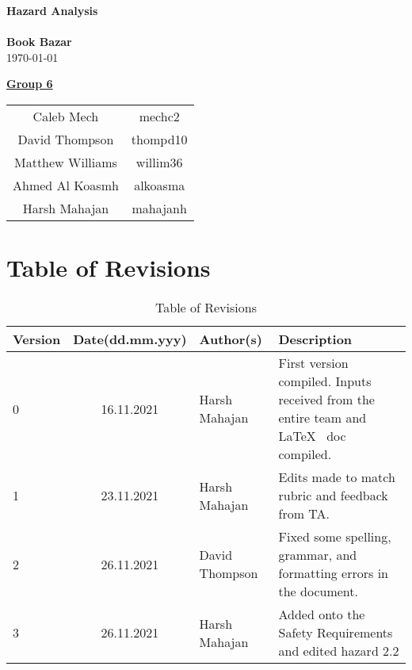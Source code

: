\documentclass[fullpage]{article}
\begin{document}
\vspace*{\fill}
\begin{center}

  {\Huge \textbf{Hazard Analysis}}\\
\hrulefill\\[2mm]
  {\huge \textbf{Book Bazar}}\\[2mm]
{\large \today}\\[15mm]
{\large
\underline{\textbf{Group 6}}\\
\begin{tabular}{ c c }

 Caleb Mech & mechc2\\
 David Thompson & thompd10\\
 Matthew Williams & willim36\\
 Ahmed Al Koasmh & alkoasma\\
 Harsh Mahajan	& mahajanh
\end{tabular}
}

\end{center}

\vspace*{\fill}

\newpage
\begingroup
\hypersetup{hidelinks}
\tableofcontents

\listoftables
\endgroup
\newpage


\section*{Table of Revisions}
\begin{table}[h]
\centering
\begin{tabular}{| l | c | p{2.8cm}| p{3.5cm} |}
\hline
 \rowcolor{lightgray}
\textbf{Version} & \textbf{Date(dd.mm.yyy)} &\textbf{Author(s)} &\textbf{Description}\\
\hline
0 & 16.11.2021 &  Harsh Mahajan & First version compiled. Inputs received from the entire team and \LaTeX~ doc compiled.\\
\hline
1 & 23.11.2021 &  Harsh Mahajan & Edits made to match rubric and feedback from TA.\\
\hline
2 & 26.11.2021 & David Thompson & Fixed some spelling, grammar, and formatting errors in the document. \\
\hline
3 & 26.11.2021 & Harsh Mahajan & Added onto the Safety Requirements and edited hazard 2.2\\
\hline
\end{tabular}
\caption{Table of Revisions}

\end{table}
\end{document}
